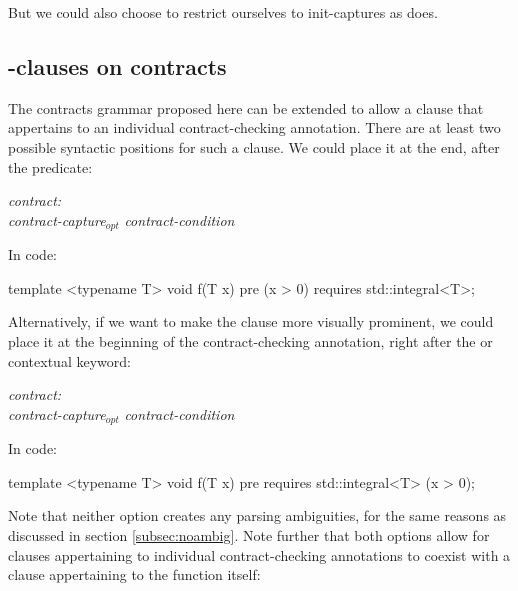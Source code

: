 But we could also choose to restrict ourselves to init-captures as  does. 

\subsection{-clauses on contracts}
\label{subsec:requires}

The contracts grammar proposed here can be extended to allow a  clause that appertains to an individual contract-checking annotation. There are at least two possible syntactic positions for such a  clause. We could place it at the end, after the predicate:

\begin{adjustwidth}{0.5cm}{0.5cm}
\emph{contract:} \\
\phantom{~~~}\emph{contract-capture}$_{opt}$ \emph{contract-condition} 

\end{adjustwidth}

In code:

\vspace{2mm}
\begin{codeblock}
template <typename T>
void f(T x)
  pre (x > 0) requires std::integral<T>;
\end{codeblock}
\vspace{2mm}

Alternatively, if we want to make the  clause more visually prominent, we could place it at the beginning of the contract-checking annotation, right after the  or  contextual keyword:

\begin{adjustwidth}{0.5cm}{0.5cm}

\emph{contract:} \\
\phantom{~~~} \emph{contract-capture}$_{opt}$ \emph{contract-condition}

\end{adjustwidth}

In code:

\vspace{2mm}
\begin{codeblock}
template <typename T>
void f(T x)
  pre requires std::integral<T> (x > 0);
\end{codeblock}
\vspace{2mm}

Note that neither option creates any parsing ambiguities, for the same reasons as discussed in section \ref{subsec:noambig}. Note further that both options allow for  clauses appertaining to individual contract-checking annotations to coexist with a  clause appertaining to the function itself:

